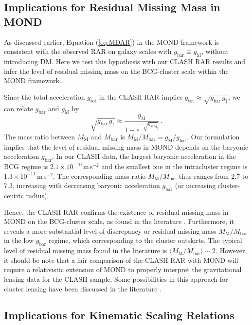 \documentclass[a4paper,iop,twocolumn,twocolappendix,numberedappendix,appendixfloats]{emulateapj}
\newcommand{\Mbar}{M_\mathrm{bar}}
\newcommand{\gbar}{g_\mathrm{bar}}
\newcommand{\gtot}{g_\mathrm{tot}}
\begin{document}
\subsection{Implications for Residual Missing Mass in MOND}

As discussed earlier, Equation (\ref{eq:MDAR}) in the MOND framework is
consistent with the observed RAR on galaxy scales with $\gbar\equiv
g_\mathrm{M}$, without introducing DM.
Here we test this hypothesis with our CLASH RAR results and infer the level
of residual missing mass on the BCG-cluster scale within the MOND
framework.

Since the total acceleration $\gtot$ in the CLASH RAR implies
 $\gtot\approx\sqrt{\gbar\,g_\ddag}$,
 we can relate $\gbar$ and $g_\mathrm{M}$ by
\begin{equation}\label{eq:missing baryon}
\sqrt{\gbar\,g_\ddag}\approx \frac{g_{\mathrm{M}}}{1-e^{-\sqrt{g_{\mathrm{M}/g_\dag}}}}\,.
\end{equation}
The mass ratio between $M_\mathrm{M}$ and $\Mbar$ is
$M_{\mathrm{M}}/\Mbar=g_{\mathrm{M}}/\gbar$.
Our formulation implies that the level of residual missing mass in MOND
depends on the baryonic acceleration $\gbar$.
In our CLASH data,
the largest baryonic acceleration in the BCG regime
is $2.1\times10^{-10}$\,m\,s$^{-2}$ and
 the smallest one in the intracluster regime is
 $1.3\times10^{-11}$\,m\,s$^{-2}$.
The corresponding mass ratio $M_{\mathrm{M}}/\Mbar$ thus ranges from
$2.7$ to $7.3$, increasing with decreasing baryonic acceleration $\gbar$
(or increasing cluster-centric radius).

 Hence,
 the CLASH RAR confirms the existence of residual missing mass in MOND
 on the BCG-cluster scale,
 as found in the literature \citep{Sanders99, Sanders03, PS05, FM12}.
 Furthermore, it reveals a more substantial level of
 discrepancy or residual missing mass $M_\mathrm{M}/\Mbar$ in the low
 $\gbar$ regime, which corresponding to the cluster outskirts.
 The typical level of residual missing mass found in the literature is
 $\langle M_\mathrm{M}/\Mbar\rangle\sim 2$.
However, it should be note that a fair comparison of the CLASH RAR with
MOND will require a relativistic extension of MOND to properly interpret
the gravitational lensing data for the CLASH sample.
Some possibilities in this approach for cluster lensing have been discussed
 in the literature \citep{Bruneton09, ZF12, FM12}.

\subsection{Implications for Kinematic Scaling Relations}
\end{document}
